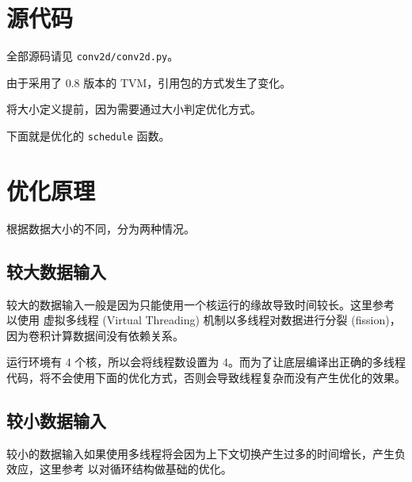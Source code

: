 \documentclass[UTF8]{ctexart}
\begin{document}

\section{源代码}

全部源码请见 \verb"conv2d/conv2d.py"。


由于采用了 0.8 版本的 TVM，引用包的方式发生了变化。



将大小定义提前，因为需要通过大小判定优化方式。



下面就是优化的 \verb"schedule" 函数。



\section{优化原理}

根据数据大小的不同，分为两种情况。

\subsection{较大数据输入}

较大的数据输入一般是因为只能使用一个核运行的缘故导致时间较长。这里参考 \cite{vta} 以使用 虚拟多线程 (Virtual Threading) 机制以多线程对数据进行分裂 (fission)，因为卷积计算数据间没有依赖关系。

运行环境有 4 个核，所以会将线程数设置为 4。而为了让底层编译出正确的多线程代码，将不会使用下面的优化方式，否则会导致线程复杂而没有产生优化的效果。

\subsection{较小数据输入}

\lstset{numbers=none}

较小的数据输入如果使用多线程将会因为上下文切换产生过多的时间增长，产生负效应，这里参考 \cite{cpu} 以对循环结构做基础的优化。
\end{document}
